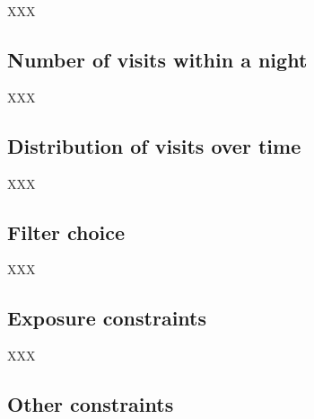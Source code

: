 \documentclass[12pt,letterpaper]{article}
\begin{document}
XXX

\subsection{Number of visits within a night}

XXX

\subsection{Distribution of visits over time}

XXX

\subsection{Filter choice}

XXX

\subsection{Exposure constraints}

XXX

\subsection{Other constraints}
\end{document}
